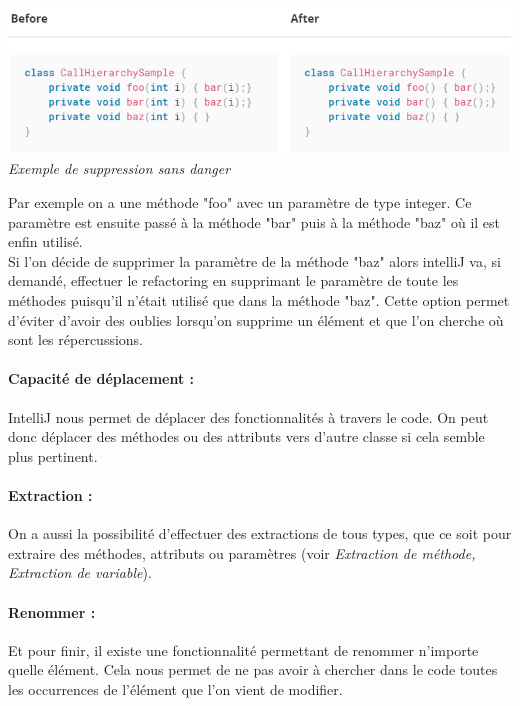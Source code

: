 \documentclass[a4paper,twoside,12pt,openright]{report}
\begin{document}
\begin{center}
\includegraphics[scale=0.8]{Image/SafeDelete.png}\\
\itshape{Exemple de suppression sans  danger \cite{ref9}}
\end{center}

Par exemple on a une méthode "foo" avec un paramètre de type integer. Ce paramètre est ensuite passé à la méthode "bar" puis à la méthode "baz" où il est enfin utilisé.\\
Si l'on décide de supprimer la paramètre de la méthode "baz" alors intelliJ va, si demandé, effectuer le refactoring en supprimant le paramètre de toute les méthodes puisqu'il n'était utilisé que dans la méthode "baz".
Cette option permet d'éviter d'avoir des oublies lorsqu'on supprime un élément et que l'on cherche où sont les répercussions.\\

\paragraph{Capacité de déplacement :}
IntelliJ nous permet de déplacer des fonctionnalités à travers le code. On peut donc déplacer des méthodes ou des attributs vers d'autre classe si cela semble plus pertinent.\\

\paragraph{Extraction :}
On a aussi la possibilité d'effectuer des extractions de tous types, que ce soit pour extraire des méthodes, attributs ou paramètres (voir \textit{Extraction de méthode, Extraction de variable}).\\

\paragraph{Renommer :}
Et pour finir, il existe une fonctionnalité permettant de renommer n'importe quelle élément. Cela nous permet de ne pas avoir à chercher dans le code toutes les occurrences de l'élément que l'on vient de modifier.\\
\end{document}
